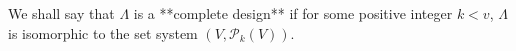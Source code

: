 We shall say that $\Lambda$ is a **complete design** if for some positive integer $k < v$, $\Lambda$ is isomorphic to the set system $(V, \mathcal{P}_k(V))$.
